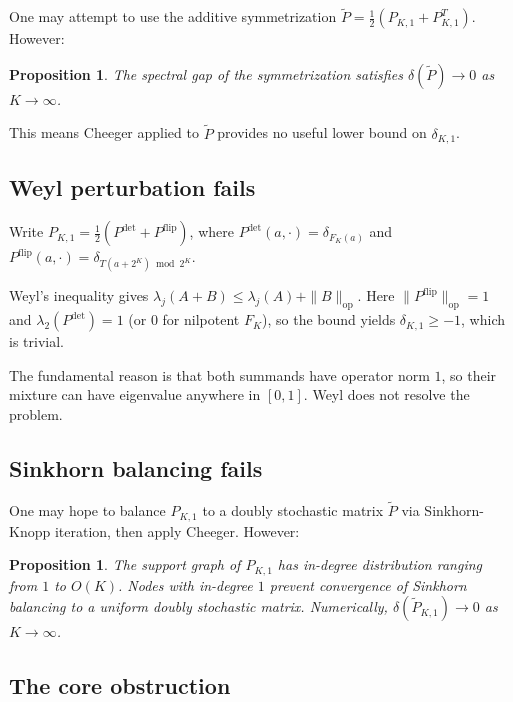 \documentclass[12pt]{article}
\newtheorem{proposition}[theorem]{Proposition}
\theoremstyle{definition}
\newcommand{\PKone}{P_{K,1}}
\begin{document}
One may attempt to use the additive symmetrization $\tilde{P} = \frac{1}{2}(\PKone + \PKone^T)$. However:

\begin{proposition}
The spectral gap of the symmetrization satisfies $\delta(\tilde{P}) \to 0$ as $K \to \infty$.
\end{proposition}

This means Cheeger applied to $\tilde{P}$ provides no useful lower bound on $\delta_{K,1}$.

\subsection{Weyl perturbation fails}

Write $\PKone = \frac{1}{2}(P^{\mathrm{det}} + P^{\mathrm{flip}})$, where $P^{\mathrm{det}}(a,\cdot) = \delta_{F_K(a)}$ and $P^{\mathrm{flip}}(a,\cdot) = \delta_{T(a+2^K) \bmod 2^K}$.

Weyl's inequality gives $\lambda_j(A+B) \leq \lambda_j(A) + \|B\|_{\mathrm{op}}$. Here $\|P^{\mathrm{flip}}\|_{\mathrm{op}} = 1$ and $\lambda_2(P^{\mathrm{det}}) = 1$ (or 0 for nilpotent $F_K$), so the bound yields $\delta_{K,1} \geq -1$, which is trivial.

The fundamental reason is that both summands have operator norm $1$, so their mixture can have eigenvalue anywhere in $[0,1]$. Weyl does not resolve the problem.

\subsection{Sinkhorn balancing fails}

One may hope to balance $\PKone$ to a doubly stochastic matrix $\tilde{P}$ via Sinkhorn-Knopp iteration, then apply Cheeger. However:

\begin{proposition}
The support graph of $\PKone$ has in-degree distribution ranging from $1$ to $O(K)$. Nodes with in-degree $1$ prevent convergence of Sinkhorn balancing to a uniform doubly stochastic matrix. Numerically, $\delta(\tilde{P}_{K,1}) \to 0$ as $K \to \infty$.
\end{proposition}

\subsection{The core obstruction}
\end{document}
